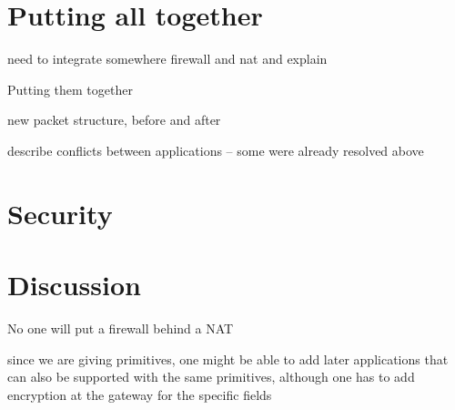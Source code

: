 \section{Putting all together}\label{sec:all}

need to integrate somewhere firewall and nat and explain

Putting them together

new packet structure, before and after

describe conflicts between applications -- some were already resolved above 
\section{Security}

\section{Discussion}

No one will put a firewall behind a NAT

since we are giving primitives, one might be able to add later applications that can also be supported with the same primitives, although one has to add encryption at the gateway for the specific fields 